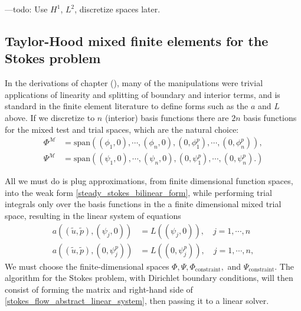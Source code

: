 ---todo: Use $H^1$, $L^2$, discretize spaces later.
\subsection{Taylor-Hood mixed finite elements for the Stokes problem}

In the derivations of chapter (), many of the manipulations were trivial applications of linearity and splitting of
boundary and interior terms, and is standard in the finite element literature to define forms such as the $a$ and $L$ above.
If we discretize to $n$ (interior) basis functions
there are $2n$ basis functions for the mixed test and trial spaces, which are the natural choice:
\begin{equation}\label{mixed_space_basis_functions}
\begin{split}
    \Phi^\mathcal{M} &= \text{span}\left(
        (\phi_1, 0),\cdots,(\phi_n, 0), (0,\phi_1^p),\cdots,(0,\phi_n^p)
    \right),\\
    \Psi^\mathcal{M} &= \text{span}\left(
        (\psi_1, 0),\cdots,(\psi_n, 0), (0,\psi_1^p),\cdots,(0,\psi_n^p).
    \right)
\end{split}
\end{equation}


All we must do is plug approximations, from finite dimensional function spaces, into the weak form \eqref{steady_stokes_bilinear_form}, 
while performing trial integrals only over the basis functions in the a finite dimensional mixed trial space, resulting in the
linear system of equations
\begin{equation}\label{stokes_flow_mixed_equations_1}
\begin{split}
    a((\tilde{u}, \tilde{p}), (\psi_j, 0)) &= L((\psi_j, 0)), \quad j = 1,\cdots,n\\
    a((\tilde{u}, \tilde{p}), (0, \psi^p_j)) &= L((0, \psi^p_j)), \quad j = 1,\cdots,n,
\end{split}
\end{equation}
We must choose the finite-dimensional spaces $\Phi,\Psi,\Phi_{\text{constraint}},$ and $\Psi_{\text{constraint}}$.
The algorithm for the Stokes problem, with Dirichlet boundary conditions, will then consist of forming the matrix and right-hand side of
\eqref{stokes_flow_abstract_linear_system}, then passing it to a linear solver.


